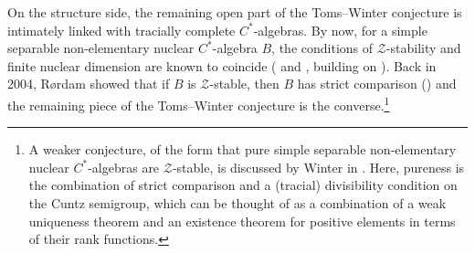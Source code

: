 \documentclass[a4paper,11pt]{amsart}
\theoremstyle{definition}
\numberwithin{equation}{section}
\numberwithin{theorem}{section}
\newcommand{\Z}{\mathcal Z}
\begin{document}
On the structure side, the remaining open part of the Toms--Winter conjecture is intimately linked with tracially complete $C^*$-algebras. By now, for a simple separable non-elementary nuclear $C^*$-algebra $B$, the conditions of $\Z$-stability and finite nuclear dimension are known to coincide (\cite{Wi12,Wi10,Ti14} and \cite{CETWW,CE}, building on  \cite{BBSTWW,SWW15,MS14}). Back in 2004, R\o{}rdam showed that if $B$ is $\Z$-stable, then $B$ has strict comparison (\cite{Ro04}) and the remaining piece of the Toms--Winter conjecture is the converse.\footnote{A weaker conjecture, of the form that pure simple separable non-elementary nuclear $C^*$-algebras are $\Z$-stable, is discussed by Winter in \cite[Section 5.4]{Wi17}.  Here, pureness is the combination of strict comparison and a (tracial) divisibility condition on the Cuntz semigroup, which can be thought of as a combination of a weak uniqueness theorem and an existence theorem for positive elements in terms of their rank functions.\label{fn:WinterConjecture}}
\end{document}
